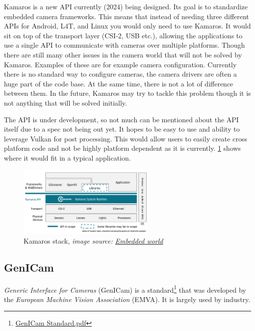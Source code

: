 Kamaros is a new API currently (2024) being designed. Its goal is to
standardize embedded camera frameworks. This means that instead of needing
three different APIs for Android, L4T, and Linux you would only need to use
Kamaros. It would sit on top of the transport layer (CSI-2, USB etc.), allowing
the applications to use a single API to communicate with cameras over multiple
platforms. Though there are still many other issues in the camera world that will not
be solved by Kamaros. Examples of these are for example camera configuration.
Currently there is no standard way to configure cameras, the camera drivers are
often a huge part of the code base. At the same time, there is not a lot of
difference between them. In the future, Kamaros may try to tackle this problem
though it is not anything that will be solved initially.

The API is under development, so not much can be mentioned about the API itself
due to a spec not being out yet. It hopes to be easy to use and ability to
leverage Vulkan for post processing. This would allow users to easily create
cross platform code and not be highly platform dependent as it is currently.
\cref{fig:kamaros_stack} shows where it would fit in a typical application.

\begin{figure}
    \begin{center}
        \includegraphics[width=0.60\textwidth]{figures/kamaros_stack.png}
    \end{center}
    \caption[Kamaros stack]{Kamaros stack, \textit{image source: \href{https://www.khronos.org/assets/uploads/developers/presentations/Khronos\_Kamaros\_Embedded\_World\_Mar23.pdf}{Embedded world}}}\label{fig:kamaros_stack}
\end{figure}
\footnotetext{}

\subsection {GenICam}
\textit{Generic Interface for Cameras} (GenICam) is a standard\footnote{\href{https://www.emva.org/wp-content/uploads/GenICam_Standard_v2_1_1.pdf}{GenICam Standard.pdf}} that was
developed by the \textit{European Machine Vision Association} (EMVA). It is
largely used by industry.

